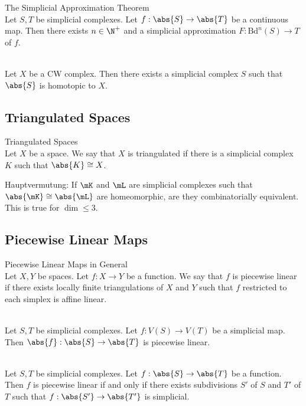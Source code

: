 \documentclass[a4paper]{article}
\begin{document}
\begin{thm}{The Simplicial Approximation Theorem}{}\\
Let $S,T$ be simplicial complexes. Let $f:\abs{S}\to\abs{T}$ be a continuous map. Then there exists $n\in\N^+$ and a simplicial approximation $F:\text{Bd}^n(S)\to T$ of $f$. 
\end{thm}

\begin{prp}{}{}\\
Let $X$ be a CW complex. Then there exists a simplicial complex $S$ such that $\abs{S}$ is homotopic to $X$. 
\end{prp}

\subsection{Triangulated Spaces}
\begin{defn}{Triangulated Spaces}{}\\
Let $X$ be a space. We say that $X$ is triangulated if there is a simplicial complex $K$ such that $\abs{K}\cong X$. 
\end{defn}

Hauptvermutung: If $\mK$ and $\mL$ are simplicial complexes such that $\abs{\mK}\cong\abs{\mL}$ are homeomorphic, are they combinatorially equivalent. This is true for $\dim\leq 3$. 

\subsection{Piecewise Linear Maps}
\begin{defn}{Piecewise Linear Maps in General}{}\\
Let $X,Y$ be spaces. Let $f:X\to Y$ be a function. We say that $f$ is piecewise linear if there exists locally finite triangulations of $X$ and $Y$ such that $f$ restricted to each simplex is affine linear. 
\end{defn}

\begin{lmm}{}{}\\
Let $S,T$ be simplicial complexes. Let $f:V(S)\to V(T)$ be a simplicial map. Then $\abs{f}:\abs{S}\to\abs{T}$ is piecewise linear. 
\end{lmm}

\begin{prp}{}{}\\
Let $S,T$ be simplicial complexes. Let $f:\abs{S}\to\abs{T}$ be a function. Then $f$ is piecewise linear if and only if there exists subdivisions $S'$ of $S$ and $T'$ of $T$ such that $f:\abs{S'}\to\abs{T'}$ is simplicial. 
\end{prp}
\end{document}
